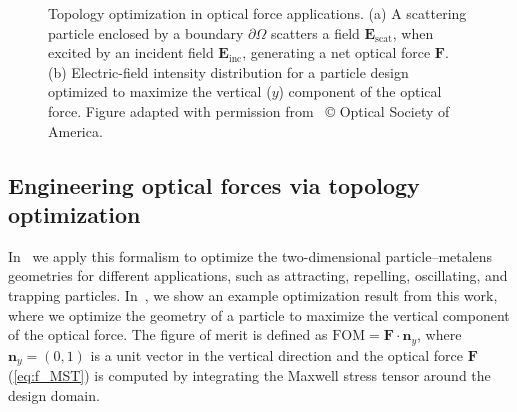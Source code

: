 \begin{figure}[tb]
    \centering
    \caption{Topology optimization in optical force applications. (a) A scattering particle 
    enclosed by a boundary $\partial \Omega$ scatters a field $\mathbf{E}_\text{scat}$, when excited by an incident field $\mathbf{E}_\text{inc}$, 
    generating a net optical force $\mathbf{F}$. (b) Electric-field intensity distribution for a particle design optimized to maximize the vertical ($y$)
    component of the optical force. Figure adapted with permission from~\cite{ownpub2} © Optical Society of America.}
    \label{fig:eng_res}
\end{figure}

\subsection*{Engineering optical forces via topology optimization}

In~\cite{ownpub2} we apply this formalism to optimize the two-dimensional particle--metalens geometries for different applications, such as attracting, repelling, 
oscillating, and trapping particles. In~, we show an example optimization result from this work, where we optimize the geometry of a particle to maximize the vertical component of the optical force. 
The figure of merit is defined as $\text{FOM} = \mathbf{F} \cdot \mathbf{n}_y$, where $\mathbf{n}_y = (0, 1)$ is a unit vector in the vertical direction and 
the optical force $\mathbf{F}$ (\eqref{eq:f_MST}) is computed by integrating the Maxwell stress tensor around the design domain. 

